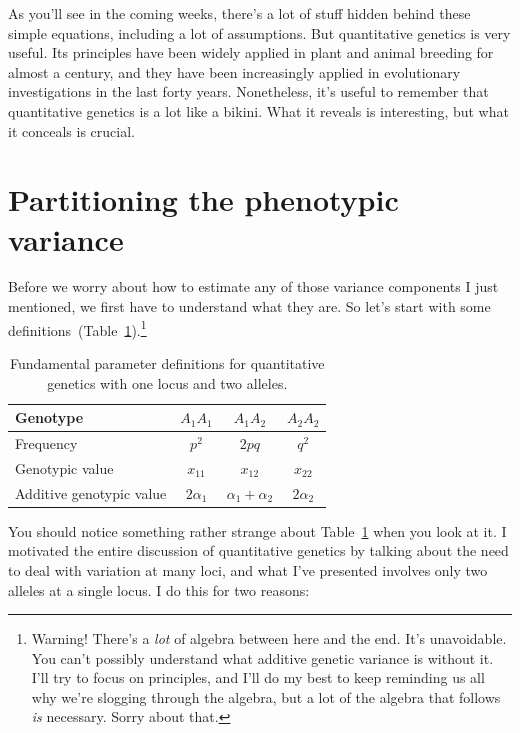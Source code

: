 As you'll see in the coming weeks, there's a lot of stuff hidden
behind these simple equations, including a lot of assumptions. But
quantitative genetics is very useful. Its principles have been widely
applied in plant and animal breeding for almost a century, and they
have been increasingly applied in evolutionary investigations in the
last forty years. Nonetheless, it's useful to remember that
quantitative genetics is a lot like a bikini. What it reveals is
interesting, but what it conceals is crucial.

\section*{Partitioning the phenotypic variance}

Before we worry about how to estimate any of those variance components
I just mentioned, we first have to understand what they are. So let's
start with some
definitions~(Table~\ref{table:definitions}).\footnote{Warning! There's
  a {\it lot\/} of algebra between here and the end. It's
  unavoidable. You can't possibly understand what additive genetic
  variance is without it. I'll try to focus on principles, and I'll do
  my best to keep reminding us all why we're slogging through the
  algebra, but a lot of the algebra that follows {\it is\/}
  necessary. Sorry about that.}

\begin{table}
\begin{center}
\begin{tabular}{l|ccc}
\hline\hline
Genotype                 & $A_1A_1$    & $A_1A_2$ & $A_2A_2$ \\
\hline
Frequency                & $p^2$       & $2pq$    & $q^2$ \\
Genotypic value          & $x_{11}$    & $x_{12}$ & $x_{22}$ \\
Additive genotypic value & $2\alpha_1$ & $\alpha_1 + \alpha_2$ 
                                                  & $2\alpha_2$ \\
\hline
\end{tabular}
\end{center}
\caption{Fundamental parameter definitions for quantitative genetics
  with one locus and two alleles.}\label{table:definitions}
\end{table}

You should notice something rather strange about
Table~\ref{table:definitions} when you look at it. I motivated the
entire discussion of quantitative genetics by talking about the need
to deal with variation at many loci, and what I've presented involves
only two alleles at a single locus. I do this for two reasons:

